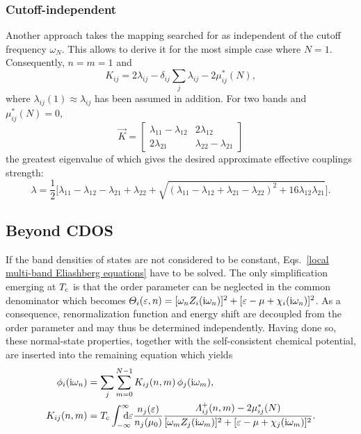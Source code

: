 \subsubsection{Cutoff-independent}
\label{cutoff-independent}

Another approach takes the mapping searched for as independent of the cutoff
frequency $\omega_N$. This allows to derive it for the most simple case where
$N = 1$. Consequently, $n = m = 1$ and
%
\begin{equation*}
    K_{i j} = 2 \lambda_{i j} - \delta_{i j} \sum_j \lambda_{i j}
    - 2 \mu^*_{i j}(N),
\end{equation*}
%
where $\lambda_{i j}(1) \approx \lambda_{i j}$ has been assumed in addition.
For two bands and $\mu^*_{i j}(N) = 0$,
%
\begin{equation*}
    \vec K = \begin{bmatrix}
        \lambda_{1 1} - \lambda_{1 2} & 2 \lambda_{1 2} \\
        2 \lambda_{2 1} & \lambda_{2 2} - \lambda_{2 1}
    \end{bmatrix}
\end{equation*}
%
the greatest eigenvalue of which gives the desired approximate effective
couplings strength:
%
\begin{equation*}
    \lambda = \frac 1 2 \Big[
        \lambda_{1 1} - \lambda_{1 2} - \lambda_{2 1} + \lambda_{2 2} + \sqrt{
            (\lambda_{1 1} - \lambda_{1 2} + \lambda_{2 1} - \lambda_{2 2})^2
            + 16 \lambda_{1 2} \lambda_{2 1}
            }
    \Big].
\end{equation*}

\subsection{Beyond CDOS}

If the band densities of states are not considered to be constant,
Eqs.~\ref{local multi-band Eliashberg equations} have to be solved. The only
simplification emerging at $T \sb{\text{c}}$ is that the order parameter can be
neglected in the common denominator which becomes $\varTheta_i(\varepsilon, n) =
[\omega_n Z_i(\mathrm i \omega_n)]^2 + [\varepsilon - \mu + \chi_i(\mathrm i \omega_n)]^2$. As a
consequence, renormalization function and energy shift are decoupled from the
order parameter and may thus be determined independently. Having done so, these
normal-state properties, together with the self-consistent chemical potential,
are inserted into the remaining equation which yields
%
\begin{equation} \label{linearized gap equation}
    \begin{split}
        \phi_i(\I \omega_n) &= \sum_j \sum_{m = 0}^{N - 1}
        K_{i j}(n, m) \, \phi_j(\I \omega_m),
        \\
        K_{i j}(n, m) &= T \sub c \int \from{-\infty} \till \infty \D \epsilon
        \frac{n_j(\epsilon)}{n_j(\mu_0)}
        \frac {\Lambda_{i j}^+(n, m) - 2 \mu^*_{i j}(N)}
        {[\omega_m Z_j(\I \omega_m)]^2 + [\epsilon - \mu + \chi_j(\I \omega_m)]^2}.
    \end{split}
\end{equation}


